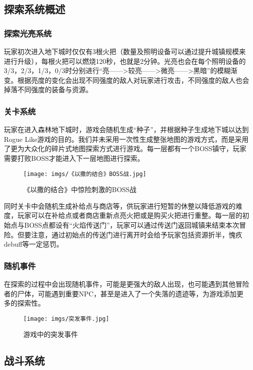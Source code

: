 \documentclass[UTF8,AutoFakeBold=1,AutoFakeSlant,zihao=-4]{cucthesis}
\begin{document}
\subsection{探索系统概述}

\subsubsection{探索光亮系统}
玩家初次进入地下城时仅仅有3根火把（数量及照明设备可以通过提升城镇规模来进行升级），每根火把可以燃烧120秒，也就是2分钟。光亮也会在每个照明设备的3/3，2/3，1/3，0/3时分别进行“亮——>较亮——>微亮——>黑暗”的模糊渐变。根据亮度的变化会出现不同强度的敌人对玩家进行攻击，不同强度的敌人也会掉落不同强度的装备与资源。

\subsubsection{关卡系统}
玩家在进入森林地下城时，游戏会随机生成“种子”，并根据种子生成地下城以达到Rogue Like游戏的目的。我们并未采用一次性生成整张地图的游戏方式，而是采用了更为大众化的碎片式地图探索方式进行游戏。每一层都有一个BOSS镇守，玩家需要打败BOSS才能进入下一层地图进行探索。

\begin{figure}[ht]
    \centering
    \texttt{[image: imgs/《以撒的结合》BOSS战.jpg]}
    \caption{《以撒的结合》中惊险刺激的BOSS战}
\end{figure}


同时关卡中会随机生成补给点与商店等，供玩家进行短暂的休整以降低游戏的难度，玩家可以在补给点或者商店重新点亮火把或是购买火把进行重整。每一层的初始点与BOSS点都设有“火焰传送门”，玩家可以通过传送门返回城镇来结束本次冒险。但要注意，通过初始点的传送门进行离开时会给予玩家包括资源折半，愧疚debuff等一定惩罚。


\subsubsection{随机事件}

在探索的过程中会出现随机事件，可能是更强大的敌人出现，也可能遇到其他冒险者的尸体，可能遇到重要NPC，甚至是进入了一个失落的遗迹等，为游戏添加更多的探索性。

\begin{figure}[ht]
    \centering
    \texttt{[image: imgs/突发事件.jpg]}
    \caption{游戏中的突发事件}
\end{figure}


\subsection{战斗系统}
\end{document}
